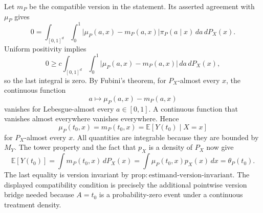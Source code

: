 Let \(m_P\) be the compatible version in the statement. Its asserted agreement with \(\mu_P\) gives
\[
0=
\int_{[0,1]^d}\int_0^1
\lvert\mu_P(a,x)-m_P(a,x)\rvert
\pi_P(a\mid x)\,da\,dP_X(x).
\]
Uniform positivity implies
\[
0\ge
c\int_{[0,1]^d}\int_0^1
\lvert\mu_P(a,x)-m_P(a,x)\rvert\,da\,dP_X(x),
\]
so the last integral is zero. By Fubini's theorem, for \(P_X\)-almost every \(x\), the continuous function
\[
a\longmapsto\mu_P(a,x)-m_P(a,x)
\]
vanishes for Lebesgue-almost every \(a\in[0,1]\). A continuous function that vanishes almost everywhere vanishes everywhere. Hence
\[
\mu_P(t_0,x)=m_P(t_0,x)
=\mathbb E[Y(t_0)\mid X=x]
\]
for \(P_X\)-almost every \(x\). All quantities are integrable because they are bounded by \(M_Y\). The tower property and the fact that \(p_X\) is a density of \(P_X\) now give
\[
\mathbb E[Y(t_0)]
=\int m_P(t_0,x)\,dP_X(x)
=\int\mu_P(t_0,x)p_X(x)\,dx
=\theta_P(t_0).
\]
The last equality is version invariant by \(\mathrm{prop:estimand\text{-}version\text{-}invariant}\). The displayed compatibility condition is precisely the additional pointwise version bridge needed because \(A=t_0\) is a probability-zero event under a continuous treatment density.
